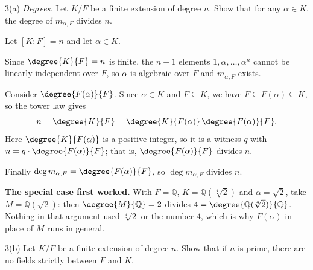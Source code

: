 \documentclass[11pt]{article}
\begin{document}
\begin{problem}{3(a)}
  \emph{Degrees.} Let $K/F$ be a finite extension of degree $n$. Show that for
  any $\alpha \in K$, the degree of $m_{\alpha,F}$ divides $n$.
\end{problem}

\begin{solution}
  Let $[K:F] = n$ and let $\alpha \in K$.

  Since $\degree{K}{F} = n$ is finite, the $n+1$ elements
  $1, \alpha, \dots, \alpha^{n}$ cannot be linearly independent over $F$, so
  $\alpha$ is algebraic over $F$ and $m_{\alpha,F}$ exists.

  Consider $\degree{F(\alpha)}{F}$. Since $\alpha \in K$ and $F \subseteq K$, we
  have $F \subseteq F(\alpha) \subseteq K$, so the tower law gives
  \[
    n = \degree{K}{F}
      = \degree{K}{F(\alpha)}\,\degree{F(\alpha)}{F} .
  \]
  Here $\degree{K}{F(\alpha)}$ is a positive integer, so it is a witness $q$
  with $n = q \cdot \degree{F(\alpha)}{F}$; that is,
  $\degree{F(\alpha)}{F}$ divides $n$.

  Finally $\deg m_{\alpha,F} = \degree{F(\alpha)}{F}$, so $\deg m_{\alpha,F}$
  divides $n$.

  \medskip
  \textbf{The special case first worked.} With $F = \mathbb{Q}$,
  $K = \mathbb{Q}(\sqrt[4]{2})$ and $\alpha = \sqrt{2}$, take
  $M = \mathbb{Q}(\sqrt{2})$: then $\degree{M}{\mathbb{Q}} = 2$ divides
  $4 = \degree{\mathbb{Q}(\sqrt[4]{2})}{\mathbb{Q}}$. Nothing in that argument
  used $\sqrt[4]{2}$ or the number $4$, which is why $F(\alpha)$ in place of
  $M$ runs in general.
\end{solution}

\begin{problem}{3(b)}
  Let $K/F$ be a finite extension of degree $n$. Show that if $n$ is prime,
  there are no fields strictly between $F$ and $K$.
\end{problem}
\end{document}
